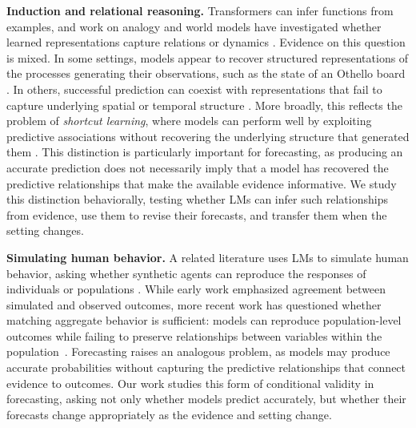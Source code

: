 \documentclass{article}
\begin{document}
\noindent\textbf{Induction and relational reasoning.}
Transformers can infer functions from examples, and work on analogy and world
models have investigated whether learned representations capture relations or dynamics
\citep{garg2022what,chan2022data,webb2023emergent,yasunaga2024large,ha2018world,lecun2022path}.
Evidence on this question is mixed. In some settings, models appear to recover
structured representations of the processes generating their observations,
such as the state of an Othello board \citep{li2023emergent}. In others,
successful prediction can coexist with representations that fail to capture
underlying spatial or temporal structure \citep{vafa2025foundation}.
More broadly, this reflects the problem of \emph{shortcut learning}, where models can perform well by exploiting predictive associations without recovering the underlying structure that generated them \citep{geirhos2020shortcut}.
This distinction is particularly important for forecasting, as producing an
accurate prediction does not necessarily imply that a model has recovered the
predictive relationships that make the available evidence informative.
We study this distinction behaviorally, testing whether LMs can infer such
relationships from evidence, use them to revise their forecasts, and transfer
them when the setting changes.

\noindent\textbf{Simulating human behavior.}
A related literature uses LMs to simulate human behavior, asking whether
synthetic agents can reproduce the responses of individuals or populations
\citep{park2023generative,aher2023simulate,argyle2023out}.
While early work emphasized agreement between simulated and observed outcomes, more recent work has questioned whether matching aggregate behavior is sufficient: models can reproduce population-level outcomes while failing to preserve relationships between variables within the population~\citep{bisbee2024synthetic,xie2026evaluating}.
Forecasting raises an analogous problem, as models may produce accurate
probabilities without capturing the predictive relationships that connect
evidence to outcomes. Our work studies this form of conditional validity in
forecasting, asking not only whether models predict accurately, but whether
their forecasts change appropriately as the evidence and setting change.
\end{document}
